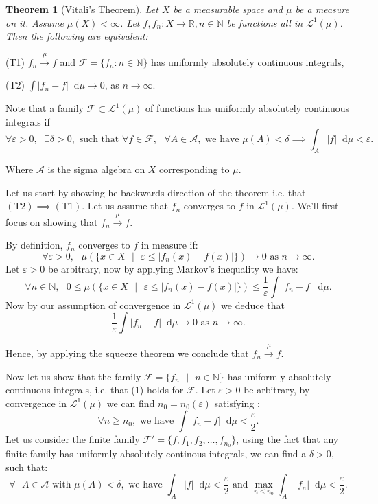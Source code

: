 \documentclass[11pt]{article}
\newcommand\st{\text{ } | \text{ }}
\newcommand\sthat{\text{ such that }}
\newcommand\R{\mathbb{R}}
\newcommand\N{\mathbb{N}}
\newcommand\Lmu{\mathcal{L}^1(\mu)}
\newcommand\A{\mathcal{A}}
\newcommand\weh{\text{ we have }}
\newcommand\as{\text{ as }}
\newcommand\sep{\text{ }}
\newcommand*\diff{\mathop{}\!\mathrm{d}}
\newtheorem*{theorem}{Theorem}
\begin{document}
\begin{theorem}[Vitali's Theorem]
  Let $X$ be a measurable space and $\mu$ be a measure on it. Assume $\mu(X)<\infty$.
  Let $f, f_n : X \to \R, n \in \N$ be functions all in $\Lmu$. Then
  the following are equivalent:
\end{theorem}
    \hspace{1cm} (T1) $f_n \xrightarrow{\mu} f $ and $ \mathcal{F} = \lbrace f_n : n \in \N\rbrace$ has uniformly absolutely continuous
     integrals,

    \hspace{1cm} (T2) $\int |f_n - f| \diff\mu \to 0$, as $n \to \infty$.

Note that a family $\mathcal{F} \subset \Lmu$ of functions
has uniformly absolutely continuous integrals if
\begin{equation}
  \forall \varepsilon > 0, \sep \exists \delta > 0, \sthat  \forall f \in \mathcal{F},
  \sep \forall A \in \mathcal{A}, \weh \mu(A) < \delta \implies \int_A |f|\diff \mu < \varepsilon.
\end{equation}

Where $\A$ is the sigma algebra on $X$ corresponding to $\mu$.

Let us start by showing he backwards direction of the theorem i.e. that
$(\text{T}2) \implies (\text{T}1)$. Let us assume that  $f_n$ converges to  $f$ in  $\Lmu$.
We'll first focus on showing that  $f_n \xrightarrow{\mu} f$.

By definition, $f_n$ converges to  $f$ in measure if:
  \[
    \forall \varepsilon > 0,\text{ }  \mu \left(\lbrace x \in X \st
    \varepsilon \le |f_n(x) - f(x)|\rbrace\right) \to 0 \text{ as } n \to \infty
 .\]
Let $\varepsilon > 0$ be arbitrary, now by applying Markov's inequality we have:
\[
 \forall n \in \N, \text{ } 0 \le \mu \left(\lbrace x \in X \st
\varepsilon \le |f_n(x) - f(x)|\rbrace\right) \le \frac{1}{\varepsilon} \int |f_n - f|
\diff\mu
.\]
Now by our assumption of convergence in $\Lmu$ we deduce that
\[
\frac{1}{\varepsilon}\int |f_n - f| \diff\mu \to 0 \as n \to \infty
.\]

Hence, by applying the squeeze theorem we conclude that $f_n \xrightarrow{\mu} f$.

Now let us show that the family $\mathcal{F} = \lbrace f_n \st n \in \N\rbrace $ has uniformly
absolutely continuous integrals, i.e. that (1) holds for $\mathcal{F}$.
Let $\varepsilon > 0$ be arbitrary, by convergence in $\Lmu$ we can find  $n_0 = n_0(\varepsilon)$
satisfying :
\[
\forall n \ge n_0, \weh \int |f_n - f| \diff\mu < \frac{\varepsilon}{2}
.\]
Let us consider the finite family $\mathcal{F}' = \lbrace f, f_1, f_2, \ldots, f_{n_0}\rbrace $,
using the fact that any finite family has uniformly absolutely continous integrals,
we can find a $\delta > 0$, such that:
\begin{equation}
  \forall \text{ } A \in \A \text{ with } \mu(A) < \delta, \weh \int_A |f| \diff\mu < \frac{\varepsilon}{2}
  \text{ and } \max_{n \le n_0}\int_A |f_n| \diff\mu < \frac{\varepsilon}{2}.
\end{equation}
\end{document}
